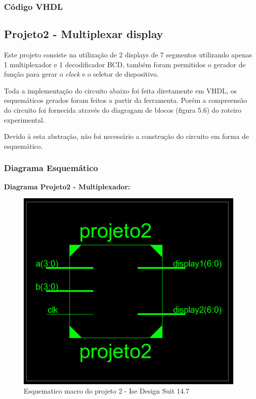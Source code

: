 \documentclass[12pts]{article}
\begin{document}
\newpage
\subsubsection{Código VHDL}



\clearpage

\subsection{Projeto2 - Multiplexar display}

	Este projeto consiste na utilização de 2 displays de 7 segmentos utilizando apenas 1 multiplexador e 1 decodificador BCD, também foram permitidos o gerador de função para gerar o \textit{clock} e o seletor de dispositivo.
	
	Toda a implementação do circuito abaixo foi feita diretamente em VHDL, os esquemáticos gerados foram feitos a partir da ferramenta. Porém a compreensão do circuito foi fornecida através do diagragam de blocos (figura 5.6) do roteiro experimental.
	
	Devido à esta abstração, não foi necessário a construção do circuito em forma de esquemático.

\subsubsection{Diagrama Esquemático}

\textbf{Diagrama Projeto2 - Multiplexador:}

\begin{figure}[!htb]
  \centering
  \includegraphics[scale=0.7	]{imagens/esquematico_projeto2macro}
  \caption{Esquematico macro do projeto 2 - Ise Design Suit 14.7}
  \label{figRotulo}
\end{figure}
\end{document}
